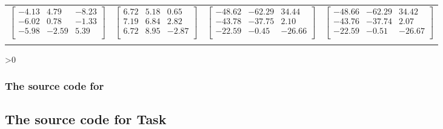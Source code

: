 \documentclass[12pt,a4paper,onesided]{report}
\newcommand{\source}{\pagebreak
	\ifnum\value{section}>0
		\subsection{The source code for \thesection}

	\else
		\section{The source code for Task \thechapter}

	\fi
	}
\begin{document}
\begin{table}[h]
{\begin{tabular}{cccc}
				$\begin{bmatrix}-4.13&4.79&-8.23\\-6.02&0.78&-1.33\\-5.98&-2.59&5.39\\\end{bmatrix}$&
				$\begin{bmatrix}6.72&5.18&0.65\\7.19&6.84&2.82\\6.72&8.95&-2.87\\\end{bmatrix}$&
				$\begin{bmatrix}-48.62&-62.29&34.44\\-43.78&-37.75&2.10\\-22.59&-0.45&-26.66\\\end{bmatrix}$&
				$\begin{bmatrix}-48.66&-62.29&34.42\\-43.76&-37.74&2.07\\-22.59&-0.51&-26.67\\\end{bmatrix}$
			\\	&&&	\\
			\bottomrule
		\end{tabular}
	}
\end{table}
\source

\chapter{}
\chapter{}
\chapter{}
\printbibliography[title={References}]
\end{document}
